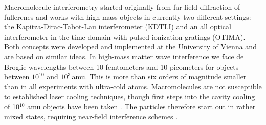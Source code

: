 \documentclass[11pt]{article}
\begin{document}
Macromolecule interferometry started originally from far-field diffraction of fullerenes \cite{Arndt1999}
and works with high mass objects in currently two different settings: the Kapitza-Dirac-Tabot-Lau interferometer (KDTLI)
and an all optical interferometer in the time domain with pulsed ionization gratings (OTIMA).
Both concepts were developed and implemented at the University of Vienna \cite{Gerlich2007,Haslinger2013} and are based on similar ideas.
In high-mass 
matter wave interference we face de Broglie wavelengths between 10 femtometers and 10 picometers for objects between $10^{10}$ and $10^3$\,amu. This is more than six orders of magnitude smaller than in all experiments with ultra-cold atoms. Macromolecules are not susceptible to established laser cooling techniques, though first steps into the cavity cooling of 10$^{10}$ amu objects have been taken \cite{kiesel2013cavity, asenbaum2013cavity}.
The particles therefore start out in rather mixed states, requiring near-field interference schemes \cite{Clauser1997}. 
\end{document}
